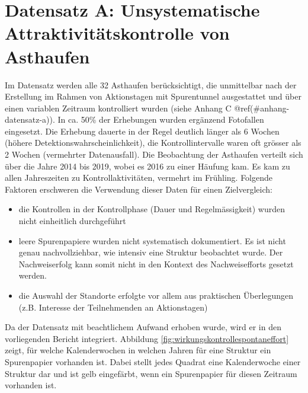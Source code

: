 \documentclass[
  oneside]{scrbook}
\providecommand{\tightlist}{%
  \setlength{\itemsep}{0pt}\setlength{\parskip}{0pt}}
\begin{document}
\hypertarget{datensatz-a-unsystematische-attraktivituxe4tskontrolle-von-asthaufen}{%
\section{Datensatz A: Unsystematische Attraktivitätskontrolle von Asthaufen}\label{datensatz-a-unsystematische-attraktivituxe4tskontrolle-von-asthaufen}}

Im Datensatz werden alle 32 Asthaufen berücksichtigt, die unmittelbar nach der Erstellung im Rahmen von Aktionstagen mit Spurentunnel ausgestattet und über einen variablen Zeitraum kontrolliert wurden (siehe Anhang C @ref(\#anhang-datensatz-a)). In ca. 50\% der Erhebungen wurden ergänzend Fotofallen eingesetzt. Die Erhebung dauerte in der Regel deutlich länger als 6 Wochen (höhere Detektionswahrscheinlichkeit), die Kontrollintervalle waren oft grösser als 2 Wochen (vermehrter Datenausfall). Die Beobachtung der Asthaufen verteilt sich über die Jahre 2014 bis 2019, wobei es 2016 zu einer Häufung kam. Es kam zu allen Jahreszeiten zu Kontrollaktivitäten, vermehrt im Frühling. Folgende Faktoren erschweren die Verwendung dieser Daten für einen Zielvergleich:

\begin{itemize}
\tightlist
\item
  die Kontrollen in der Kontrollphase (Dauer und Regelmässigkeit) wurden nicht einheitlich durchgeführt
\item
  leere Spurenpapiere wurden nicht systematisch dokumentiert. Es ist nicht genau nachvollziehbar, wie intensiv eine Struktur beobachtet wurde. Der Nachweiserfolg kann somit nicht in den Kontext des Nachweisefforts gesetzt werden.
\item
  die Auswahl der Standorte erfolgte vor allem aus praktischen Überlegungen (z.B. Interesse der Teilnehmenden an Aktionstagen)
\end{itemize}

Da der Datensatz mit beachtlichem Aufwand erhoben wurde, wird er in den vorliegenden Bericht integriert. Abbildung \ref{fig:wirkungskontrollespontaneffort} zeigt, für welche Kalenderwochen in welchen Jahren für eine Struktur ein Spurenpapier vorhanden ist. Dabei stellt jedes Quadrat eine Kalenderwoche einer Struktur dar und ist gelb eingefärbt, wenn ein Spurenpapier für diesen Zeitraum vorhanden ist.
\end{document}
